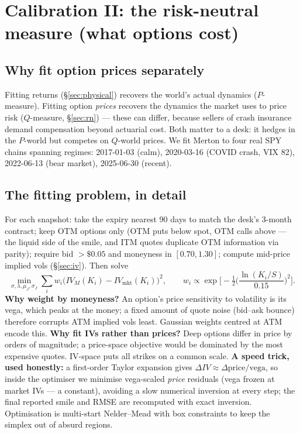 \documentclass[11pt,a4paper]{article}
\begin{document}
\section{Calibration II: the risk-neutral measure (what options cost)}
\label{sec:rncalib}

\subsection{Why fit option prices separately}
Fitting returns (\S\ref{sec:physical}) recovers the world's actual dynamics
($P$-measure). Fitting option \emph{prices} recovers the dynamics the market
uses to price risk ($Q$-measure, \S\ref{sec:rn}) --- these can differ, because
sellers of crash insurance demand compensation beyond actuarial cost. Both
matter to a desk: it hedges in the $P$-world but competes on $Q$-world prices.
We fit Merton to four real SPY chains spanning regimes: 2017-01-03 (calm),
2020-03-16 (COVID crash, VIX 82), 2022-06-13 (bear market), 2025-06-30
(recent).

\subsection{The fitting problem, in detail}
For each snapshot: take the expiry nearest 90 days to match the desk's 3-month
contract; keep OTM options only (OTM puts below spot, OTM calls above ---
the liquid side of the smile, and ITM quotes duplicate OTM information via
parity); require bid $>\$0.05$ and moneyness in $[0.70,1.30]$; compute
mid-price implied vols (\S\ref{sec:iv}). Then solve
\begin{equation}
\min_{\sigma,\lambda,\mu_J,\sigma_J}
\sum_i w_i\big(IV_M(K_i)-IV_{\text{mkt}}(K_i)\big)^2,
\qquad
w_i\propto\exp\!\Big[-\tfrac12\Big(\frac{\ln(K_i/S)}{0.15}\Big)^{\!2}\Big].
\label{eq:rnobj}
\end{equation}
\textbf{Why weight by moneyness?} An option's price sensitivity to volatility
is its vega, which peaks at the money; a fixed amount of quote noise (bid--ask
bounce) therefore corrupts ATM implied vols least. Gaussian weights centred at
ATM encode this. \textbf{Why fit IVs rather than prices?} Deep options differ
in price by orders of magnitude; a price-space objective would be dominated by
the most expensive quotes. IV-space puts all strikes on a common scale.
\textbf{A speed trick, used honestly:} a first-order Taylor expansion gives
$\Delta IV\approx\Delta\text{price}/\text{vega}$, so inside the optimiser we
minimise vega-scaled \emph{price} residuals (vega frozen at market IVs ---
a constant), avoiding a slow numerical inversion at every step; the final
reported smile and RMSE are recomputed with exact inversion. Optimisation is
multi-start Nelder--Mead with box constraints to keep the simplex out of absurd
regions.
\end{document}
